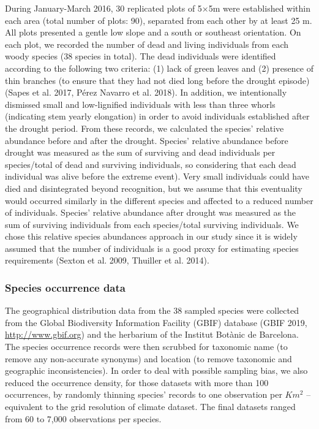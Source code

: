 \documentclass[11pt,twoside]{reedthesis}
\begin{document}
During January-March 2016, 30 replicated plots of 5×5m were established
within each area (total number of plots: 90), separated from each other
by at least 25 m. All plots presented a gentle low slope and a south or
southeast orientation. On each plot, we recorded the number of dead and
living individuals from each woody species (38 species in total). The
dead individuals were identified according to the following two
criteria: (1) lack of green leaves and (2) presence of thin branches (to
ensure that they had not died long before the drought episode) (Sapes et
al. 2017, Pérez Navarro et al. 2018). In addition, we intentionally
dismissed small and low-lignified individuals with less than three
whorls (indicating stem yearly elongation) in order to avoid individuals
established after the drought period. From these records, we calculated
the species' relative abundance before and after the drought. Species'
relative abundance before drought was measured as the sum of surviving
and dead individuals per species/total of dead and surviving
individuals, so considering that each dead individual was alive before
the extreme event). Very small individuals could have died and
disintegrated beyond recognition, but we assume that this eventuality
would occurred similarly in the different species and affected to a
reduced number of individuals. Species' relative abundance after drought
was measured as the sum of surviving individuals from each species/total
surviving individuals. We chose this relative species abundances
approach in our study since it is widely assumed that the number of
individuals is a good proxy for estimating species requirements (Sexton
et al. 2009, Thuiller et al. 2014).\par

\subsubsection{Species occurrence data}\label{species-occurrence-data}

The geographical distribution data from the 38 sampled species were
collected from the Global Biodiversity Information Facility (GBIF)
database (GBIF 2019, \url{http://www.gbif.org}) and the herbarium of the
Institut Botànic de Barcelona. The species occurrence records were then
scrubbed for taxonomic name (to remove any non-accurate synonyms) and
location (to remove taxonomic and geographic inconsistencies). In order
to deal with possible sampling bias, we also reduced the occurrence
density, for those datasets with more than 100 occurrences, by randomly
thinning species' records to one observation per \(Km^2\) -- equivalent
to the grid resolution of climate dataset. The final datasets ranged
from 60 to 7,000 observations per species.\par
\end{document}

